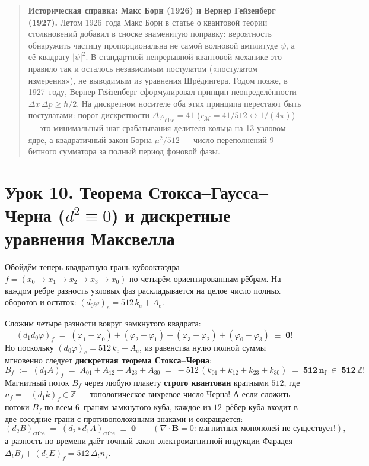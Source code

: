 \begin{quote}
\small\textbf{Историческая справка: Макс Борн (1926) и Вернер Гейзенберг (1927).}
Летом 1926~года Макс Борн в статье о квантовой теории столкновений добавил в сноске знаменитую поправку: вероятность обнаружить частицу пропорциональна не самой волновой амплитуде $\psi$, а её квадрату $|\psi|^2$. В стандартной непрерывной квантовой механике это правило так и осталось независимым постулатом («постулатом измерения»), не выводимым из уравнения Шрёдингера. Годом позже, в 1927~году, Вернер Гейзенберг сформулировал принцип неопределённости $\Delta x\,\Delta p \ge \hbar/2$. На дискретном носителе оба этих принципа перестают быть постулатами: порог дискретности $\Delta\varphi_{\mathrm{disc}} = 41$ ($r_{\mathcal{M}} = 41/512 \leftrightarrow 1/(4\pi)$) --- это минимальный шаг срабатывания делителя кольца на 13-узловом ядре, а квадратичный закон Борна $\mu^2/512$ --- число переполнений 9-битного сумматора за полный период фоновой фазы.
\end{quote}

\section{Урок 10. Теорема Стокса--Гаусса--Черна (\texorpdfstring{$d^2 \equiv 0$}{d\^2 = 0}) и дискретные уравнения Максвелла}

Обойдём теперь квадратную грань кубооктаэдра $f = (x_0\to x_1\to x_2\to x_3\to x_0)$ по четырём ориентированным рёбрам. На каждом ребре разность узловых фаз раскладывается на целое число полных оборотов и остаток: $(d_0\varphi)_e = 512\,k_e + A_e$.

Сложим четыре разности вокруг замкнутого квадрата:
\[
  (d_1 d_0\varphi)_f \;=\; (\varphi_1 - \varphi_0) + (\varphi_2 - \varphi_1) + (\varphi_3 - \varphi_2) + (\varphi_0 - \varphi_3) \;\equiv\; \mathbf{0}!
\]
Но поскольку $(d_0\varphi)_e = 512\,k_e + A_e$, из равенства нулю полной суммы мгновенно следует \textbf{дискретная теорема Стокса--Черна}:
\begin{equation}
  \label{eq:course-stokes-chern}
  B_f \;:=\; (d_1 A)_f \;=\; A_{01} + A_{12} + A_{23} + A_{30}
  \;=\; -512\,(k_{01} + k_{12} + k_{23} + k_{30})
  \;=\; \mathbf{512\,n_f \;\in\; 512\,\mathbb{Z}}!
\end{equation}
Магнитный поток $B_f$ через любую плакету \textbf{строго квантован} кратными $512$, где $n_f = -(d_1 k)_f\in\mathbb{Z}$ --- топологическое вихревое число Черна! А если сложить потоки $B_f$ по всем $6$~граням замкнутого куба, каждое из $12$~рёбер куба входит в две соседние грани с противоположными знаками и сокращается:
\[
  (d_2 B)_{\mathrm{cube}} \;=\; (d_2\circ d_1 A)_{\mathrm{cube}} \;\equiv\; \mathbf{0} \qquad (\nabla\cdot\mathbf{B} = 0\text{: магнитных монополей не существует!}),
\]
а разность по времени даёт точный закон электромагнитной индукции Фарадея $\Delta_t B_f + (d_1 E)_f = 512\,\Delta_t n_f$.

